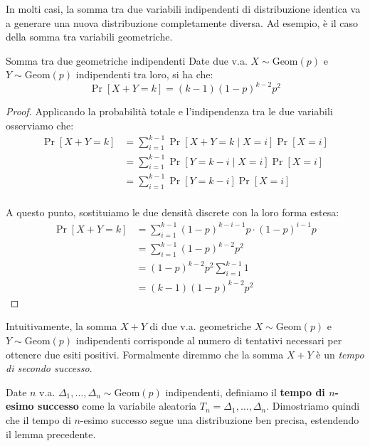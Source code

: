 \documentclass[a4paper, 12pt]{report}
\begin{document}
    In molti casi, la somma tra due variabili indipendenti di distribuzione identica va a generare una nuova distribuzione completamente diversa. Ad esempio, è il caso della somma tra variabili geometriche.

    \begin{framedprop}{Somma tra due geometriche indipendenti}
        Date due v.a. $X \sim \mathrm{Geom}(p)$ e $Y \sim \mathrm{Geom}(p)$ indipendenti tra loro, si ha che:
        \[\Pr[X+Y = k] = (k-1)(1-p)^{k-2}p^2\]
    \end{framedprop}

    \begin{proof}
        Applicando la probabilità totale e l'indipendenza tra le due variabili osserviamo che:
        \[\begin{split}
            \Pr[X + Y = k] &= \sum_{i = 1}^{k-1} \Pr[X+Y = k \mid X = i] \Pr[X = i] \\
            &= \sum_{i = 1}^{k-1} \Pr[Y = k-i \mid X = i] \Pr[X = i] \\
            &= \sum_{i = 1}^{k-1} \Pr[Y = k-i] \Pr[X = i] \\
        \end{split}\]

        A questo punto, sostituiamo le due densità discrete con la loro forma estesa:
        \[\begin{split}
            \Pr[X+Y = k] &= \sum_{i = 1}^{k-1} (1-p)^{k-i-1}p \cdot (1-p)^{i-1}p \\
            &= \sum_{i = 1}^{k-1} (1-p)^{k-2} p^2 \\
            &= (1-p)^{k-2}p^2 \sum_{i = 1}^{k-1} 1 \\
            &= (k-1)(1-p)^{k-2}p^2
        \end{split}\]
    \end{proof}

    Intuitivamente, la somma $X+Y$ di due v.a. geometriche $X \sim \mathrm{Geom}(p)$ e $Y \sim \mathrm{Geom}(p)$ indipendenti corrisponde al numero di tentativi necessari per ottenere due esiti positivi. Formalmente diremmo che la somma $X+Y$ è un \textit{tempo di secondo successo}.
    
    Date $n$ v.a. $\Delta_1, \ldots, \Delta_n \sim \mathrm{Geom}(p)$ indipendenti, definiamo il \textbf{tempo di $n$-esimo successo} come la variabile aleatoria $T_n = \Delta_1, \ldots, \Delta_n$. Dimostriamo quindi che il tempo di $n$-esimo successo segue una distribuzione ben precisa, estendendo il lemma precedente.
\end{document}
